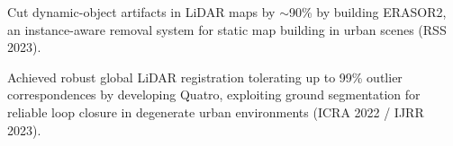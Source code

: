 \documentclass[]{deedy-resume-openfont}
\begin{document}
\begin{minipage}[t]{0.66\textwidth}
\begin{tightemize}
\item Cut dynamic-object artifacts in LiDAR maps by ${\sim}$90\% by building ERASOR2, an instance-aware removal system for static map building in urban scenes (RSS 2023).
\end{tightemize}
\sectionsep

\begin{tightemize}
\item Achieved robust global LiDAR registration tolerating up to 99\% outlier correspondences by developing Quatro, exploiting ground segmentation for reliable loop closure in degenerate urban environments (ICRA 2022 / IJRR 2023).
\end{tightemize}
\sectionsep

%
%
%
%
%

\end{minipage}
\end{document}
